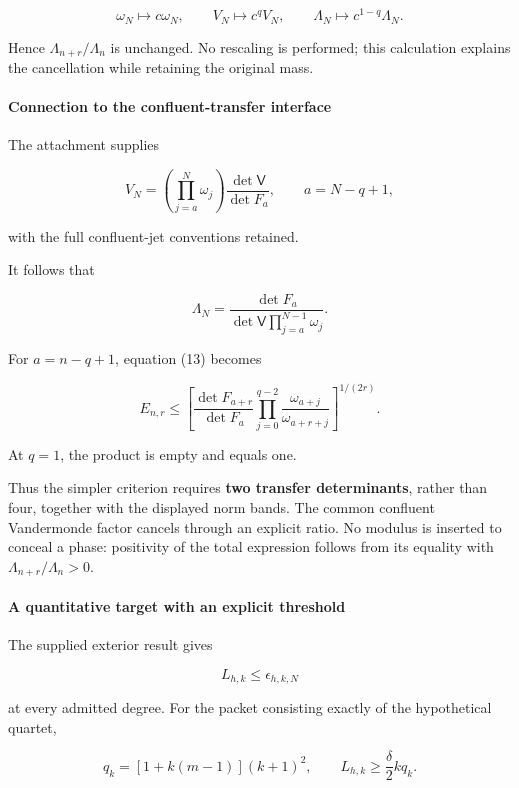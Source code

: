 \[
\omega_N\mapsto c\omega_N,\qquad
V_N\mapsto c^qV_N,\qquad
\Lambda_N\mapsto c^{1-q}\Lambda_N.
\]

Hence \(\Lambda_{n+r}/\Lambda_n\) is unchanged. No rescaling is performed; this calculation explains the cancellation while retaining the original mass.

\paragraph{Connection to the confluent-transfer interface}\label{endpoint-user_product_original--connection-to-the-confluent-transfer-interface}

The attachment supplies

\[
V_N=
\left(\prod_{j=a}^{N}\omega_j\right)
\frac{\det\mathsf V}{\det F_a},
\qquad a=N-q+1,
\]

with the full confluent-jet conventions retained.

It follows that

\[
\Lambda_N
=
\frac{\det F_a}
{\det\mathsf V\displaystyle\prod_{j=a}^{N-1}\omega_j}.
\]

For \(a=n-q+1\), equation (13) becomes

\[
\boxed{
E_{n,r}
\le
\left[
\frac{\det F_{a+r}}{\det F_a}
\prod_{j=0}^{q-2}
\frac{\omega_{a+j}}{\omega_{a+r+j}}
\right]^{1/(2r)}.
}
\tag{14}
\]

At \(q=1\), the product is empty and equals one.

Thus the simpler criterion requires \textbf{two transfer determinants}, rather than four, together with the displayed norm bands. The common confluent Vandermonde factor cancels through an explicit ratio. No modulus is inserted to conceal a phase: positivity of the total expression follows from its equality with \(\Lambda_{n+r}/\Lambda_n>0\).

\paragraph{A quantitative target with an explicit threshold}\label{endpoint-user_product_original--a-quantitative-target-with-an-explicit-threshold}

The supplied exterior result gives

\[
L_{h,k}\le\epsilon_{h,k,N}
\]

at every admitted degree. For the packet consisting exactly of the hypothetical quartet,

\[
q_k=[1+k(m-1)](k+1)^2,
\qquad
L_{h,k}\ge\frac{\delta}{2}kq_k.
\]

